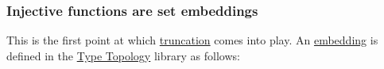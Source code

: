 \begin{code}
\AgdaSpace{}%
\AgdaSymbol{(}\AgdaSpace{}%
\AgdaOperator{\AgdaInductiveConstructor{,}}\AgdaSpace{}%
\AgdaSymbol{)}\AgdaSpace{}%
\AgdaSpace{}%
\AgdaSymbol{(}\AgdaSpace{}%
\AgdaOperator{\AgdaInductiveConstructor{,}}\AgdaSpace{}%
\AgdaSymbol{)}\<%
\\
\>[0]\AgdaSpace{}%
\AgdaSpace{}%
\AgdaSpace{}%
\AgdaDottedPattern{\AgdaSymbol{)}}\AgdaSpace{}%
\AgdaSpace{}%
\AgdaSpace{}%
\AgdaSpace{}%
\AgdaSpace{}%
\AgdaSymbol{(}\AgdaSpace{}%
\AgdaOperator{\AgdaInductiveConstructor{,}}\AgdaSpace{}%
\AgdaSymbol{)}\AgdaSpace{}%
\AgdaSymbol{=}\AgdaSpace{}%
\<%
\\
\>[0][@{}l@{\AgdaIndent{0}}]%
\>[1]\<%
\\
\>[1][@{}l@{\AgdaIndent{0}}]%
\>[2]\AgdaSpace{}%
\AgdaSymbol{:}\AgdaSpace{}%
\AgdaSpace{}%
\AgdaOperator{\AgdaInductiveConstructor{,}}\AgdaSpace{}%
\AgdaSpace{}%
\AgdaSpace{}%
\AgdaSpace{}%
\AgdaOperator{\AgdaInductiveConstructor{,}}\AgdaSpace{}%
\<%
\\
%
\>[2]\AgdaSpace{}%
\AgdaSymbol{=}\AgdaSpace{}%
\AgdaSpace{}%
\AgdaSpace{}%
\AgdaBound{-}\AgdaSpace{}%
\AgdaSpace{}%
\AgdaSymbol{(}\AgdaSpace{}%
\AgdaOperator{\AgdaInductiveConstructor{,}}\AgdaSpace{}%
\AgdaBound{-}\AgdaSymbol{))}\AgdaSpace{}%
\AgdaSymbol{(}\AgdaSpace{}%
\AgdaSpace{}%
\AgdaSpace{}%
\AgdaSpace{}%
\AgdaSymbol{\AgdaUnderscore{})}\<%
\\
\>[0]\<%
\end{code}

\subsubsection{Injective functions are set
embeddings}\label{injective-functions-are-set-embeddings}

This is the first point at which
\href{UALib.Preface.html\#truncation}{truncation} comes into play. An
\href{https://www.cs.bham.ac.uk/~mhe/HoTT-UF-in-Agda-Lecture-Notes/HoTT-UF-Agda.html\#embeddings}{embedding}
is defined in the \href{}{Type Topology} library as follows:

